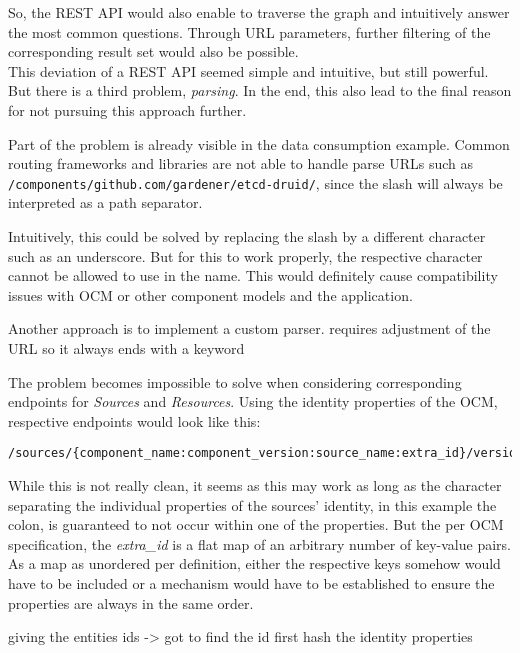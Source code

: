 So, the REST API would also enable to traverse the graph and intuitively answer the most common questions. Through URL parameters, further filtering of the corresponding result set would also be possible.\\

This deviation of a REST API seemed simple and intuitive, but still powerful. But there is a third problem, \emph{parsing}. In the end, this also lead to the final reason for not pursuing this approach further.\par
Part of the problem is already visible in the data consumption example. Common routing frameworks and libraries are not able to handle parse URLs such as \lstinline|/components/github.com/gardener/etcd-druid/|, since the slash will always be interpreted as a path separator.\par 
Intuitively, this could be solved by replacing the slash by a different character such as an underscore. But for this to work properly, the respective character cannot be allowed to use in the name. This would definitely cause compatibility issues with OCM or other component models and the application.\par 
Another approach is to implement a custom parser.
requires adjustment of the URL so it always ends with a keyword  \par 
The problem becomes impossible to solve when considering corresponding endpoints for \emph{Sources} and \emph{Resources}. Using the identity properties of the OCM, respective endpoints would look like this:

\begin{lstlisting}[basicstyle=\tiny, caption=REST API Source Endpoint, captionpos=b, label=lst:RESTAPISourceEndpoint]
/sources/{component_name:component_version:source_name:extra_id}/version/...
\end{lstlisting}

While this is not really clean, it seems as this may work as long as the character separating the individual properties of the sources' identity, in this example the colon, is guaranteed to not occur within one of the properties. But the per OCM specification, the \emph{extra\_id} is a flat map of an arbitrary number of key-value pairs. As a map as unordered per definition, either the respective keys somehow would have to be included or a mechanism would have to be established to ensure the properties are always in the same order.

giving the entities ids -> got to find the id first
hash the identity properties

